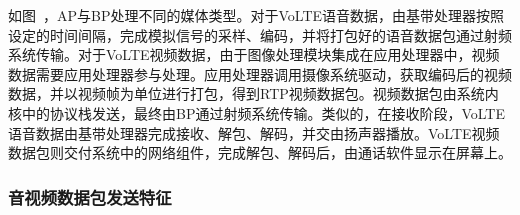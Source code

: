 
如图\ ，AP与BP处理不同的媒体类型。对于VoLTE语音数据，由基带处理器按照设定的时间间隔，完成模拟信号的采样、编码，并将打包好的语音数据包通过射频系统传输。对于VoLTE视频数据，由于图像处理模块集成在应用处理器中，视频数据需要应用处理器参与处理。应用处理器调用摄像系统驱动，获取编码后的视频数据，并以视频帧为单位进行打包，得到RTP视频数据包。视频数据包由系统内核中的协议栈发送，最终由BP通过射频系统传输。类似的，在接收阶段，VoLTE语音数据由基带处理器完成接收、解包、解码，并交由扬声器播放。VoLTE视频数据包则交付系统中的网络组件，完成解包、解码后，由通话软件显示在屏幕上。

\subsubsection{音视频数据包发送特征}
\label{chap:backinfo:volte:packets:send}


